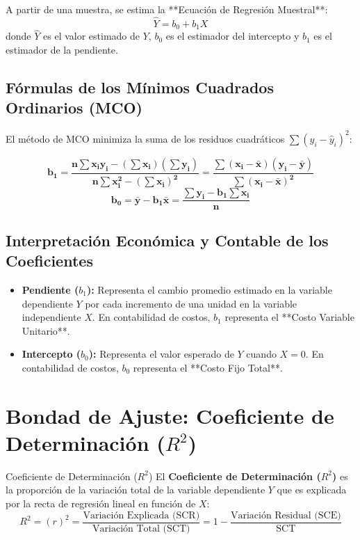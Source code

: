 A partir de una muestra, se estima la **Ecuación de Regresión Muestral**:
\begin{equation}
    \hat{Y} = b_0 + b_1 X
\end{equation}
donde $\hat{Y}$ es el valor estimado de $Y$, $b_0$ es el estimador del intercepto y $b_1$ es el estimador de la pendiente.

\subsection{Fórmulas de los Mínimos Cuadrados Ordinarios (MCO)}
El método de MCO minimiza la suma de los residuos cuadráticos $\sum (y_i - \hat{y}_i)^2$:

\begin{formulario}
\begin{equation}
    \mathbf{b_1 = \frac{n \sum x_i y_i - (\sum x_i)(\sum y_i)}{n \sum x_i^2 - (\sum x_i)^2} = \frac{\sum (x_i - \bar{x})(y_i - \bar{y})}{\sum (x_i - \bar{x})^2}}
\end{equation}
\begin{equation}
    \mathbf{b_0 = \bar{y} - b_1 \bar{x} = \frac{\sum y_i - b_1 \sum x_i}{n}}
\end{equation}
\end{formulario}

\subsection{Interpretación Económica y Contable de los Coeficientes}
\begin{itemize}
    \item \textbf{Pendiente ($b_1$):} Representa el cambio promedio estimado en la variable dependiente $Y$ por cada incremento de una unidad en la variable independiente $X$. En contabilidad de costos, $b_1$ representa el **Costo Variable Unitario**.
    \item \textbf{Intercepto ($b_0$):} Representa el valor esperado de $Y$ cuando $X = 0$. En contabilidad de costos, $b_0$ representa el **Costo Fijo Total**.
\end{itemize}

\section{Bondad de Ajuste: Coeficiente de Determinación ($R^2$)}

\begin{definicion}{Coeficiente de Determinación ($R^2$)}
El \textbf{Coeficiente de Determinación ($R^2$)} es la proporción de la variación total de la variable dependiente $Y$ que es explicada por la recta de regresión lineal en función de $X$:
\begin{equation}
    R^2 = (r)^2 = \frac{\text{Variación Explicada (SCR)}}{\text{Variación Total (SCT)}} = 1 - \frac{\text{Variación Residual (SCE)}}{\text{SCT}}
\end{equation}
\end{definicion}


